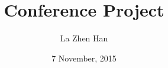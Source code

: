 \documentclass[12pt]{article}
\begin{document}
\title{Conference Project}
\author{La Zhen Han}
\date{7 November, 2015}
\maketitle



\end{document}
